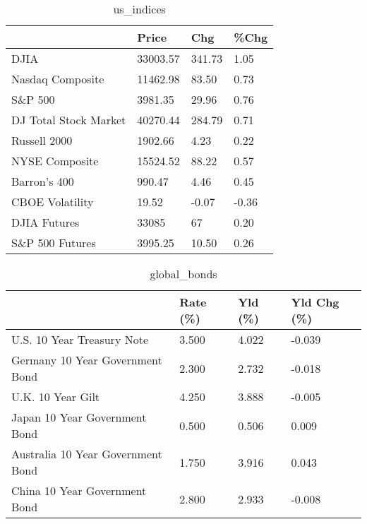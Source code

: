 \documentclass{article}%
\begin{document}
%


\begin{table}[htbp]%
\caption{us\_indices}%
\centering%
\begin{adjustbox}{width=1\textwidth}%
\begin{tabular}{llll}
\toprule
                      &    Price &    Chg &  \%Chg \\
\midrule
                 DJIA & 33003.57 & 341.73 &  1.05 \\
     Nasdaq Composite & 11462.98 &  83.50 &  0.73 \\
              S\&P 500 &  3981.35 &  29.96 &  0.76 \\
DJ Total Stock Market & 40270.44 & 284.79 &  0.71 \\
         Russell 2000 &  1902.66 &   4.23 &  0.22 \\
       NYSE Composite & 15524.52 &  88.22 &  0.57 \\
         Barron's 400 &   990.47 &   4.46 &  0.45 \\
      CBOE Volatility &    19.52 &  -0.07 & -0.36 \\
         DJIA Futures &    33085 &     67 &  0.20 \\
      S\&P 500 Futures &  3995.25 &  10.50 &  0.26 \\
\bottomrule
\end{tabular}
%
\end{adjustbox}%
\end{table}

%


\begin{table}[htbp]%
\caption{global\_bonds}%
\centering%
\begin{adjustbox}{width=1\textwidth}%
\begin{tabular}{llll}
\toprule
                                  & Rate (\%) & Yld (\%) & Yld Chg (\%) \\
\midrule
       U.S. 10 Year Treasury Note &    3.500 &   4.022 &      -0.039 \\
  Germany 10 Year Government Bond &    2.300 &   2.732 &      -0.018 \\
                U.K. 10 Year Gilt &    4.250 &   3.888 &      -0.005 \\
    Japan 10 Year Government Bond &    0.500 &   0.506 &       0.009 \\
Australia 10 Year Government Bond &    1.750 &   3.916 &       0.043 \\
    China 10 Year Government Bond &    2.800 &   2.933 &      -0.008 \\
\bottomrule
\end{tabular}
%
\end{adjustbox}%
\end{table}
\end{document}
